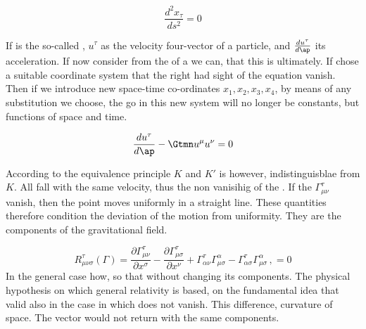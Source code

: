 \begin{equation}\label{eq:geodesicelectro}
\frac{d^{2} x_{\tau}}{d s^{2}} = 0
\end{equation}

If \ap is the so-called , $u^\tau$ as the velocity four-vector of a particle, and $\frac{d {u^\tau}}{d\ap}$ its acceleration. If now consider from the of a we can, that this is ultimately. If chose a suitable coordinate system that the right had sight of the equation vanish. Then if we introduce new space-time co-ordinates $x_{1}, x_{2}, x_{3}, x_{4}$, by means of any substitution we choose, the go in this new system will no longer be constants, but functions of space and time.

\begin{equation*}
\frac{d {u^\tau}}{d\ap} - \Gtmn u^{\mu} u^\nu =0 
\end{equation*}
 
According to the equivalence principle $K$ and $K'$ is however, indistinguisblae from $K$. All fall with the same velocity, thus the non vanisihig of the \gmn. If the $\Gamma_{\mu \nu}^{\tau}$ vanish, then the point moves uniformly in a straight line. These quantities therefore condition the deviation of the motion from uniformity. They are the components of the gravitational field.


\begin{equation}\label{eq:riemanntensorgamma}
R_{\mu \nu \sigma}^{\tau}(\Gamma)=\frac{\partial \Gamma_{\mu \nu}^{\tau}}{\partial x^{\sigma}}-\frac{\partial \Gamma_{\mu \sigma}^{\tau}}{\partial x^{\nu}}+\Gamma_{\alpha \nu}^{\tau} \Gamma_{\mu \sigma}^{\alpha}-\Gamma_{\alpha \sigma}^{\tau} \Gamma_{\mu\sigma}^{\alpha}\,, = 0
\end{equation}
%
In the general case how, so that without changing its components. The physical hypothesis on which general relativity is based, on the fundamental idea that valid also in the case in which does not vanish. This difference, curvature of space. The vector would not return with the same components.